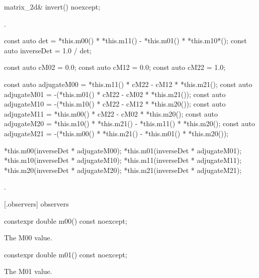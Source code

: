 \begin{itemdecl}
matrix_2d& invert() noexcept;
\end{itemdecl}
\begin{itemdescr}
\pnum
\preconditions
{}.

\pnum
\effects
\begin{codeblock}
const auto det = *this.m00() * *this.m11() - *this.m01() * *this.m10*();
const auto inverseDet = 1.0 / det;

const auto cM02 = 0.0;
const auto cM12 = 0.0;
const auto cM22 = 1.0;

const auto adjugateM00 =   *this.m11() * cM22 - cM12 * *this.m21();
const auto adjugateM01 = -(*this.m01() * cM22 - cM02 * *this.m21());
const auto adjugateM10 = -(*this.m10() * cM22 - cM12 * *this.m20());
const auto adjugateM11 =   *this.m00() * cM22 - cM02 * *this.m20();
const auto adjugateM20 =   *this.m10() * *this.m21() - *this.m11() * 
  *this.m20();
const auto adjugateM21 = -(*this.m00() * *this.m21() - *this.m01() * 
  *this.m20());

*this.m00(inverseDet * adjugateM00);
*this.m01(inverseDet * adjugateM01);
*this.m10(inverseDet * adjugateM10);
*this.m11(inverseDet * adjugateM11);
*this.m20(inverseDet * adjugateM20);
*this.m21(inverseDet * adjugateM21);
\end{codeblock}

\pnum
\returns
{}.
\end{itemdescr}

 [\matrixtwod.observers] { observers}

\begin{itemdecl}
constexpr double m00() const noexcept;
\end{itemdecl}
\begin{itemdescr}
\pnum
\returns
The M00 value.
\end{itemdescr}

\begin{itemdecl}
constexpr double m01() const noexcept;
\end{itemdecl}
\begin{itemdescr}
\pnum
\returns
The M01 value.
\end{itemdescr}

